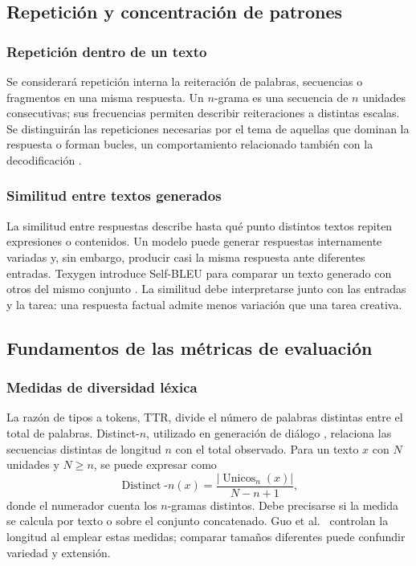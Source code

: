 \documentclass[12pt,letterpaper]{article}
\begin{document}
\subsection{Repetición y concentración de patrones}

\subsubsection{Repetición dentro de un texto}

Se considerará repetición interna la reiteración de palabras, secuencias
o fragmentos en una misma respuesta. Un \(n\)-grama es una secuencia de
\(n\) unidades consecutivas; sus frecuencias permiten describir
reiteraciones a distintas escalas. Se distinguirán las repeticiones
necesarias por el tema de aquellas que dominan la respuesta o forman
bucles, un comportamiento relacionado también con la decodificación
\cite{holtzman2020}.

\subsubsection{Similitud entre textos generados}

La similitud entre respuestas describe hasta qué punto distintos textos
repiten expresiones o contenidos. Un modelo puede generar respuestas
internamente variadas y, sin embargo, producir casi la misma respuesta
ante diferentes entradas. Texygen introduce Self-BLEU para comparar un
texto generado con otros del mismo conjunto \cite{zhu2018texygen}.
La similitud debe interpretarse junto con las entradas y la tarea: una
respuesta factual admite menos variación que una tarea creativa.

\subsection{Fundamentos de las métricas de evaluación}

\subsubsection{Medidas de diversidad léxica}

La razón de tipos a tokens, TTR, divide el número de palabras distintas
entre el total de palabras. Distinct-\(n\), utilizado en generación de
diálogo \cite{li2016}, relaciona las secuencias distintas de longitud
\(n\) con el total observado. Para un texto \(x\) con \(N\) unidades y
\(N\geq n\), se puede expresar como
\begin{equation}
    \operatorname{Distinct}\text{-}n(x)
    =\frac{|\operatorname{Unicos}_n(x)|}{N-n+1},
\end{equation}
donde el numerador cuenta los \(n\)-gramas distintos. Debe precisarse si
la medida se calcula por texto o sobre el conjunto concatenado. Guo
et al.\ \cite{guo2024} controlan la longitud al emplear estas medidas;
comparar tamaños diferentes puede confundir variedad y extensión.
\end{document}
